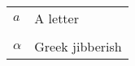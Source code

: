     \begin{table}[h]
        \begin{tabular}{@{}ll@{}}%
            \(a\) & A letter\\
            & \\
            \(\alpha\) & Greek jibberish\\
    \end{tabular}\label{tab:glossar}
    \end{table}
